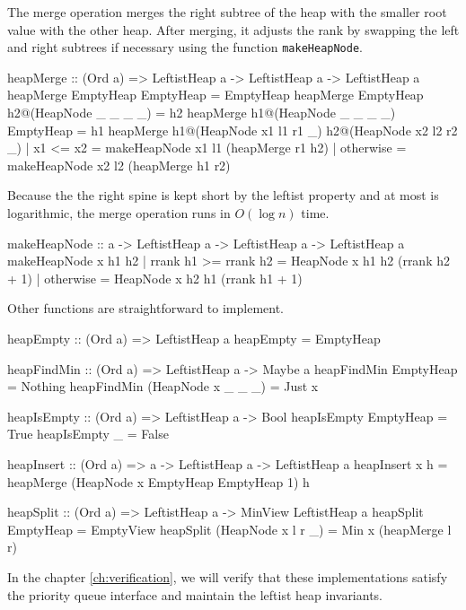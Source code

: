 The merge operation merges the right subtree of the heap with the smaller root value with the other heap. After merging,
it adjusts the rank by swapping the left and right subtrees if necessary using the function \texttt{makeHeapNode}.
\begin{code}[caption={Leftist Heap merge}, label={lst:leftist-merge}]

	heapMerge :: (Ord a) => LeftistHeap a -> LeftistHeap a -> LeftistHeap a
	heapMerge EmptyHeap EmptyHeap = EmptyHeap
	heapMerge EmptyHeap h2@(HeapNode _ _ _ _) = h2
	heapMerge h1@(HeapNode _ _ _ _) EmptyHeap = h1
	heapMerge h1@(HeapNode x1 l1 r1 _) h2@(HeapNode x2 l2 r2 _)
	| x1 <= x2 = makeHeapNode x1 l1 (heapMerge r1 h2)
	| otherwise = makeHeapNode x2 l2 (heapMerge h1 r2)
\end{code}
Because the the right spine is kept short by the leftist property and at most is logarithmic, the merge operation runs in \(O(\log n)\) time.
\begin{code}[caption={Leftist Heap helper functions}, label={lst:leftist-helpers}]

	makeHeapNode :: a -> LeftistHeap a -> LeftistHeap a -> LeftistHeap a
	makeHeapNode x h1 h2
	| rrank h1 >= rrank h2 = HeapNode x h1 h2 (rrank h2 + 1)
	| otherwise = HeapNode x h2 h1 (rrank h1 + 1)
\end{code}

Other functions are straightforward to implement.
\begin{code}[]
	heapEmpty :: (Ord a) => LeftistHeap a
	heapEmpty = EmptyHeap

	heapFindMin :: (Ord a) => LeftistHeap a -> Maybe a
	heapFindMin EmptyHeap = Nothing
	heapFindMin (HeapNode x _ _ _) = Just x

	heapIsEmpty :: (Ord a) => LeftistHeap a -> Bool
	heapIsEmpty EmptyHeap = True
	heapIsEmpty _ = False

	heapInsert :: (Ord a) => a -> LeftistHeap a -> LeftistHeap a
	heapInsert x h = heapMerge (HeapNode x EmptyHeap EmptyHeap 1) h

	heapSplit :: (Ord a) => LeftistHeap a -> MinView LeftistHeap a
	heapSplit EmptyHeap = EmptyView
	heapSplit (HeapNode x l r _) = Min x (heapMerge l r)
\end{code}

In the chapter \ref{ch:verification}, we will verify that these implementations satisfy the priority queue interface and maintain the leftist heap invariants.

